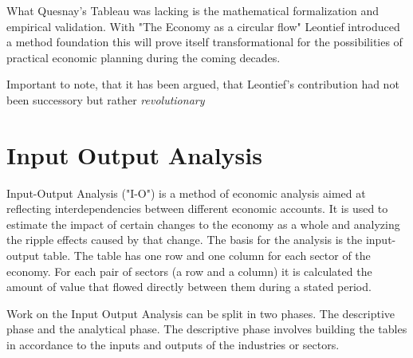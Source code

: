 \documentclass[12pt,a4paper]{scrartcl}
\begin{document}
	What Quesnay's Tableau was lacking is the mathematical formalization and empirical validation.
	With "The Economy as a circular flow" \cite[]{Leontief1991} Leontief introduced a method foundation this will prove itself transformational for the possibilities of practical economic planning during the coming decades.
	
	Important to note, that it has been argued, that Leontief's contribution had not been successory but rather \textit{revolutionary} \cite[pp. 511 - 513]{Baumol2009}
	
	
	
	
		
	
	\section{Input Output Analysis} \label{analysis}

	Input-Output Analysis ("I-O") is a method of economic analysis aimed at reflecting interdependencies between different economic accounts. It is used to estimate the impact of certain changes to the economy as a whole and analyzing the ripple effects caused by that change. The basis for the analysis is the input-output table. The table has one row and one column for each sector of the economy. For each pair of sectors (a row and a column) it is calculated the amount of value that flowed directly between them during a stated period.
	
	Work on the Input Output Analysis can be split in two phases. The descriptive phase and the analytical phase. The descriptive phase involves building the tables in accordance to the inputs and outputs of the industries or sectors.
	
\end{document}
